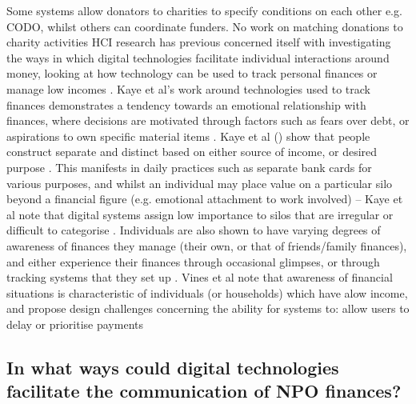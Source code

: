  Some systems allow donators to charities to specify conditions on each other e.g. CODO, whilst others can coordinate funders. No work on matching donations to charity activities
%
HCI research has previous concerned itself with investigating the ways in which digital technologies facilitate individual interactions around money, looking at how technology can be used to track personal finances or manage low incomes \cite{kaye_money_2014, vines_pay_2014}. Kaye et al's work around technologies used to track finances demonstrates a tendency towards an emotional relationship with finances, where decisions are motivated through factors such as fears over debt, or aspirations to own specific material items \cite{kaye_money_2014}. 
%
Kaye et al () show that people construct separate and distinct  based on either source of income, or desired purpose \cite{kaye_money_2014}. This manifests in daily practices such as separate bank cards for various purposes, and whilst an individual may place value on a particular silo beyond a financial figure (e.g. emotional attachment to work involved) -- Kaye et al note that digital systems assign low importance to silos that are irregular or difficult to categorise \cite{kaye_money_2014}. Individuals are also shown to have varying degrees of awareness of finances they manage (their own, or that of friends/family finances), and either experience their finances through occasional glimpses, or through tracking systems that they set up \cite{kaye_money_2014}. Vines et al note that awareness of financial situations is characteristic of individuals (or households) which have  alow income, and propose design challenges concerning the ability for systems to: allow users to delay or prioritise payments


\subsection{In what ways could digital technologies facilitate the communication of NPO finances?}




